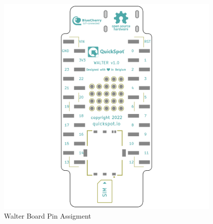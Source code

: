 \documentclass[11pt]{article}
\begin{document}
\begin{figure}[h]
    \centering
    \includegraphics[height=11cm]{back_pinout.png}
    \caption{Walter Board Pin Assigment}
    \label{fig:walter_pin_assignment}
\end{figure}
\newpage
\end{document}
